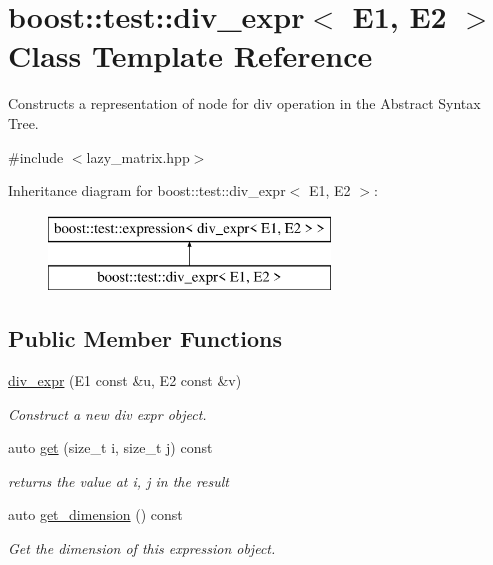 \hypertarget{classboost_1_1test_1_1div__expr}{}\section{boost\+::test\+::div\+\_\+expr$<$ E1, E2 $>$ Class Template Reference}
\label{classboost_1_1test_1_1div__expr}


Constructs a representation of node for div operation in the Abstract Syntax Tree.  




{\ttfamily \#include $<$lazy\+\_\+matrix.\+hpp$>$}

Inheritance diagram for boost\+::test\+::div\+\_\+expr$<$ E1, E2 $>$\+:\begin{figure}[H]
\begin{center}
\leavevmode
\includegraphics[height=2.000000cm]{classboost_1_1test_1_1div__expr}
\end{center}
\end{figure}
\subsection*{Public Member Functions}
\begin{DoxyCompactItemize}
\item 
\mbox{\hyperlink{classboost_1_1test_1_1div__expr_ace035a15cb161fddbee21afb89991670}{div\+\_\+expr}} (E1 const \&u, E2 const \&v)
\begin{DoxyCompactList}\small\item\em Construct a new div expr object. \end{DoxyCompactList}\item 
auto \mbox{\hyperlink{classboost_1_1test_1_1div__expr_a45c4a21d173f7b26d55a9137b910427d}{get}} (size\+\_\+t i, size\+\_\+t j) const
\begin{DoxyCompactList}\small\item\em returns the value at i, j in the result \end{DoxyCompactList}\item 
auto \mbox{\hyperlink{classboost_1_1test_1_1div__expr_a9d10c661cdba380c560e5bcf3b8f4446}{get\+\_\+dimension}} () const
\begin{DoxyCompactList}\small\item\em Get the dimension of this expression object. \end{DoxyCompactList}\end{DoxyCompactItemize}



